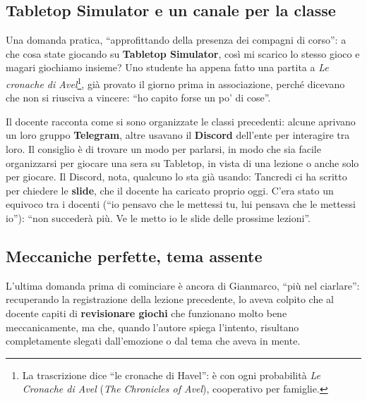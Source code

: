 \subsection{Tabletop Simulator e un canale per la classe}

Una domanda pratica, ``approfittando della presenza dei compagni di corso'': a che
cosa state giocando su \textbf{Tabletop Simulator}, così mi scarico lo stesso
gioco e magari giochiamo insieme? Uno studente ha appena fatto una partita a
\emph{Le cronache di Avel}\footnote{La trascrizione dice ``le cronache di Havel'':
è con ogni probabilità \emph{Le Cronache di Avel} (\emph{The Chronicles of
Avel}), cooperativo per famiglie.}, già provato il giorno prima in associazione,
perché dicevano che non si riusciva a vincere: ``ho capito forse un po' di cose''.

Il docente racconta come si sono organizzate le classi precedenti: alcune aprivano
un loro gruppo \textbf{Telegram}, altre usavano il \textbf{Discord} dell'ente per
interagire tra loro. Il consiglio è di trovare un modo per parlarsi, in modo che
sia facile organizzarsi per giocare una sera su Tabletop, in vista di una lezione o
anche solo per giocare. Il Discord, nota, qualcuno lo sta già usando: Tancredi ci
ha scritto per chiedere le \textbf{slide}, che il docente ha caricato proprio oggi.
C'era stato un equivoco tra i docenti (``io pensavo che le mettessi tu, lui
pensava che le mettessi io''): ``non succederà più. Ve le metto io le slide delle
prossime lezioni''.

\subsection{Meccaniche perfette, tema assente}

L'ultima domanda prima di cominciare è ancora di Gianmarco, ``più nel
ciarlare'': recuperando la registrazione della lezione precedente, lo aveva colpito
che al docente capiti di \textbf{revisionare giochi} che funzionano molto bene
meccanicamente, ma che, quando l'autore spiega l'intento, risultano completamente
slegati dall'emozione o dal tema che aveva in mente.

